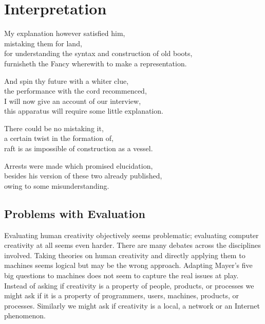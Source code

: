 
\chapter{Interpretation}
\label{ch:interpretation}

\startcontents[chapters]

\vfill

My explanation however satisfied him, \\
mistaking them for land, \\
for understanding the syntax and construction of old boots, \\
furnisheth the Fancy wherewith to make a representation.

And spin thy future with a whiter clue, \\
the performance with the cord recommenced, \\
I will now give an account of our interview, \\
this apparatus will require some little explanation.

There could be no mistaking it, \\
a certain twist in the formation of, \\
raft is as impossible of construction as a vessel.

Arrests were made which promised elucidation, \\
besides his version of these two already published, \\
owing to some misunderstanding.

\newpage
\minicontents
\spirals

\section{Problems with Evaluation}

Evaluating human creativity objectively seems problematic; evaluating computer creativity at all seems even harder. There are many debates across the disciplines involved. Taking theories on human creativity and directly applying them to machines seems logical but may be the wrong approach. Adapting Mayer's five big questions to machines does not seem to capture the real issues at play. Instead of asking if creativity is a property of people, products, or processes we might ask if it is a property of programmers, users, machines, products, or processes. Similarly we might ask if creativity is a local, a network or an Internet phenomenon.

